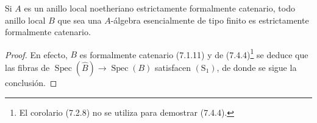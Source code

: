 \begin{corollary}[7.2.8]
\label{IV.2.s7.2.8-fr}
Si $A$ es un anillo local noetheriano estrictamente formalmente
catenario, todo anillo local $B$ que sea una $A$-álgebra esencialmente
de tipo finito es estrictamente formalmente catenario.
\end{corollary}

\begin{proof}
En efecto, $B$ es formalmente catenario (7.1.11) y de
(7.4.4)\footnote{El corolario (7.2.8) no se utiliza para demostrar
(7.4.4).} se deduce que las fibras de
$\operatorname{Spec}(\widehat B)\to\operatorname{Spec}(B)$ satisfacen
$(\mathrm S_1)$, de donde se sigue la conclusión.
\end{proof}
